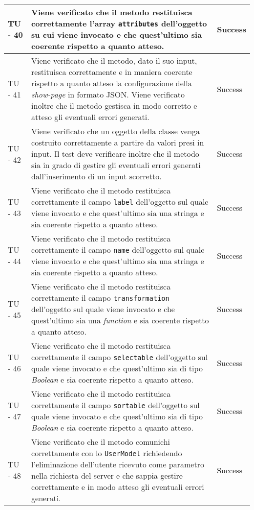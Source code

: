 \begin{center}
\begin{longtable}{ | p{3cm} | p{9cm} | p{2cm} | }
TU - 40 & Viene verificato che il metodo restituisca correttamente l'array \texttt{attributes} dell'oggetto su cui viene invocato e che quest'ultimo sia coerente rispetto a quanto atteso. & Success \\ \hline
TU - 41 & Viene verificato che il metodo, dato il suo input, restituisca correttamente e in maniera coerente rispetto a quanto atteso la configurazione della \textit{show-page} in formato JSON. Viene verificato inoltre che il metodo gestisca in modo corretto e atteso gli eventuali errori generati. & Success \\ \hline
TU - 42 & Viene verificato che un oggetto della classe venga costruito correttamente a partire da valori presi in input. Il test deve verificare inoltre che il metodo sia in grado di gestire gli eventuali errori generati dall'inserimento di un input scorretto. & Success \\ \hline
TU - 43 & Viene verificato che il metodo restituisca correttamente il campo \texttt{label} dell'oggetto sul quale viene invocato e che quest'ultimo sia una stringa e sia coerente rispetto a quanto atteso. & Success \\ \hline
TU - 44 & Viene verificato che il metodo restituisca correttamente il campo \texttt{name} dell'oggetto sul quale viene invocato e che quest'ultimo sia una stringa e sia coerente rispetto a quanto atteso. & Success \\ \hline
TU - 45 & Viene verificato che il metodo restituisca correttamente il campo \texttt{transformation} dell'oggetto sul quale viene invocato e che quest'ultimo sia una \textit{function} e sia coerente rispetto a quanto atteso. & Success \\ \hline
TU - 46 & Viene verificato che il metodo restituisca correttamente il campo \texttt{selectable} dell'oggetto sul quale viene invocato e che quest'ultimo sia di tipo \textit{Boolean} e sia coerente rispetto a quanto atteso. & Success \\ \hline
TU - 47 & Viene verificato che il metodo restituisca correttamente il campo \texttt{sortable} dell'oggetto sul quale viene invocato e che quest'ultimo sia di tipo \textit{Boolean} e sia coerente rispetto a quanto atteso. & Success \\ \hline
TU - 48 & Viene verificato che il metodo comunichi correttamente con lo \texttt{UserModel} richiedendo l'eliminazione dell'utente ricevuto come parametro nella richiesta del server e che sappia gestire correttamente e in modo atteso gli eventuali errori generati. & Success \\ \hline

\end{longtable}
\end{center}
